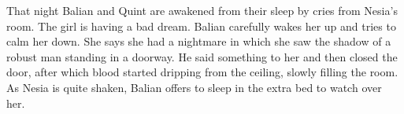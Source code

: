 That night Balian and Quint are awakened from their sleep by cries from Nesia's room. The girl is having a bad dream. Balian carefully wakes her up and tries to calm her down. She says she had a nightmare in which she saw the shadow of a robust man standing in a doorway. He said something to her and then closed the door, after which blood started dripping from the ceiling, slowly filling the room. As Nesia is quite shaken, Balian offers to sleep in the extra bed to watch over her.\\

